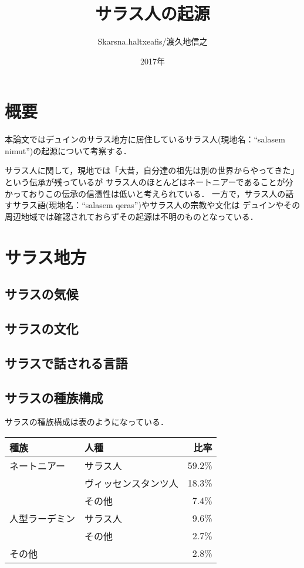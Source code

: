 \documentclass[uplatex,a4paper]{jsarticle}
\begin{document}
{
\title{\Huge サラス人の起源}
\author{Skarsna.haltxeafis/渡久地信之}
\date{2017年}
}
\maketitle
\thispagestyle{empty}


\newpage

\tableofcontents

\newpage
{}

\section{概要}
本論文ではデュインのサラス地方に居住しているサラス人(現地名：``salasem nimut'')の起源について考察する．

サラス人に関して，現地では「大昔，自分達の祖先は別の世界からやってきた」という伝承が残っているが
サラス人のほとんどはネートニアーであることが分かっておりこの伝承の信憑性は低いと考えられている．
一方で，サラス人の話すサラス語(現地名：``salasem qeras'')やサラス人の宗教や文化は
デュインやその周辺地域では確認されておらずその起源は不明のものとなっている．

\section{サラス地方}
\subsection{サラスの気候}
\subsection{サラスの文化}
\subsection{サラスで話される言語}

\subsection{サラスの種族構成}
サラスの種族構成は表のようになっている．
\begin{table}[htbp]
 \begin{tabular}{llr}
  種族 & 人種 & 比率 \\ \hline \hline
  ネートニアー & サラス人 & 59.2\% \\
   & ヴィッセンスタンツ人 & 18.3\% \\
   & その他 & 7.4\% \\ \hline
  人型ラーデミン & サラス人 & 9.6\% \\
   & その他 & 2.7\% \\ \hline
  その他 & & 2.8\%
 \end{tabular}
\end{table}
\end{document}
